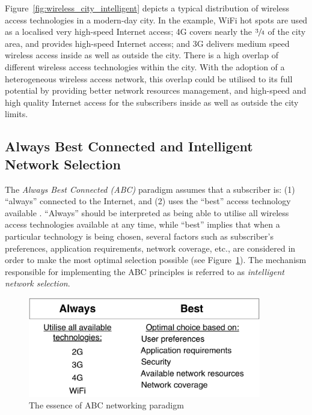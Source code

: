 Figure~\ref{fig:wireless_city_intelligent} depicts a typical distribution of wireless access technologies in a modern-day city. In the example, WiFi hot spots are used as a localised very high-speed Internet access; 4G covers nearly the $\sfrac{3}{4}$ of the city area, and provides high-speed Internet access; and 3G delivers medium speed wireless access inside as well as outside the city. There is a high overlap of different wireless access technologies within the city. With the adoption of a heterogeneous wireless access network, this overlap could be utilised to its full potential by providing better network resources management, and high-speed and high quality Internet access for the subscribers inside as well as outside the city limits.

\subsection{Always Best Connected and Intelligent Network Selection} %
\label{sub:always_best_connected_and_intelligent_network_selection_intelligent}
The \emph{Always Best Connected (ABC)} paradigm assumes that a subscriber is: (1) ``always'' connected to the Internet, and (2) uses the ``best'' access technology available \cite{ABC03}. ``Always'' should be interpreted as being able to utilise all wireless access technologies available at any time, while ``best'' implies that when a particular technology is being chosen, several factors such as subscriber's preferences, application requirements, network coverage, etc., are considered in order to make the most optimal selection possible (see Figure~\ref{fig:abc_intelligent}). The mechanism responsible for implementing the ABC principles is referred to as \emph{intelligent network selection}.

\begin{figure}[t]
    \centering
    \includegraphics[width=4in]{Intelligent/Figures/abc}
    \caption{The essence of ABC networking paradigm}
    \label{fig:abc_intelligent}
\end{figure}

